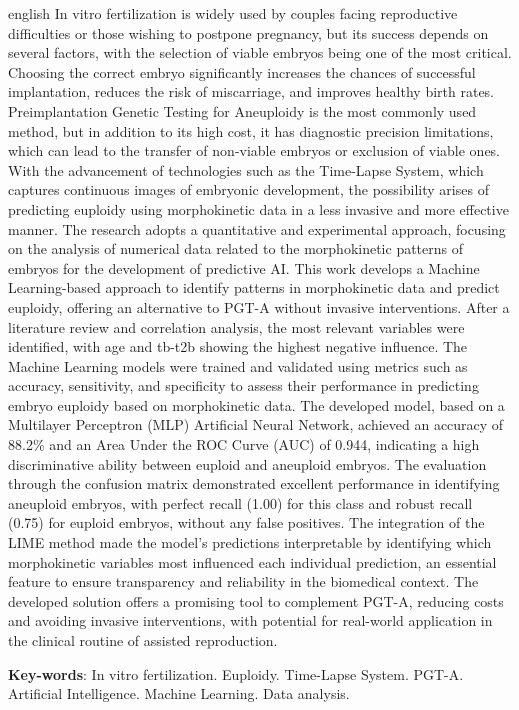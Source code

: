 \begin{resumo}[Abstract]
 \begin{otherlanguage*}{english}
    In vitro fertilization is widely used by couples facing reproductive difficulties or those wishing to postpone pregnancy, but its success depends on several factors, with the selection of viable embryos being one of the most critical. Choosing the correct embryo significantly increases the chances of successful implantation, reduces the risk of miscarriage, and improves healthy birth rates. Preimplantation Genetic Testing for Aneuploidy is the most commonly used method, but in addition to its high cost, it has diagnostic precision limitations, which can lead to the transfer of non-viable embryos or exclusion of viable ones. With the advancement of technologies such as the Time-Lapse System, which captures continuous images of embryonic development, the possibility arises of predicting euploidy using morphokinetic data in a less invasive and more effective manner. The research adopts a quantitative and experimental approach, focusing on the analysis of numerical data related to the morphokinetic patterns of embryos for the development of predictive AI. This work develops a Machine Learning-based approach to identify patterns in morphokinetic data and predict euploidy, offering an alternative to PGT-A without invasive interventions. After a literature review and correlation analysis, the most relevant variables were identified, with age and tb-t2b showing the highest negative influence. The Machine Learning models were trained and validated using metrics such as accuracy, sensitivity, and specificity to assess their performance in predicting embryo euploidy based on morphokinetic data. The developed model, based on a Multilayer Perceptron (MLP) Artificial Neural Network, achieved an accuracy of 88.2\% and an Area Under the ROC Curve (AUC) of 0.944, indicating a high discriminative ability between euploid and aneuploid embryos. The evaluation through the confusion matrix demonstrated excellent performance in identifying aneuploid embryos, with perfect recall (1.00) for this class and robust recall (0.75) for euploid embryos, without any false positives. The integration of the LIME method made the model's predictions interpretable by identifying which morphokinetic variables most influenced each individual prediction, an essential feature to ensure transparency and reliability in the biomedical context. The developed solution offers a promising tool to complement PGT-A, reducing costs and avoiding invasive interventions, with potential for real-world application in the clinical routine of assisted reproduction.
  \vspace{\onelineskip}
 
  \noindent 
  \textbf{Key-words}: In vitro fertilization. Euploidy. Time-Lapse System. PGT-A. Artificial Intelligence. Machine Learning. Data analysis.
 \end{otherlanguage*}
\end{resumo}
